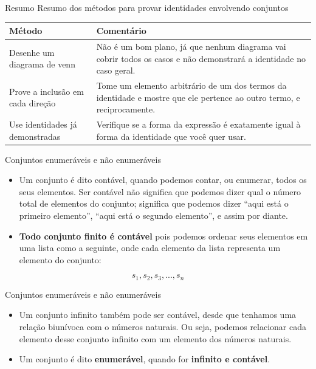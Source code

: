 \documentclass[aspectratio=169]{beamer}
\begin{document}
\begin{frame}{Resumo}
    Resumo dos métodos para provar identidades envolvendo conjuntos

    \begin{table}
        \centering
        \begin{tabular}{|m{6cm}|m{7cm}|}
        \hline
        \textbf{Método} & \textbf{Comentário} \\ \hline
        Desenhe um diagrama de venn & Não é um bom plano, já que nenhum diagrama vai cobrir todos os casos e não demonstrará a identidade no caso geral. \\ \hline
        Prove a inclusão em cada direção & Tome um elemento arbitrário de um dos termos da identidade e mostre que ele pertence ao outro termo, e reciprocamente. \\ \hline
        Use identidades já demonstradas & Verifique se a forma da expressão é
        exatamente igual à forma da
        identidade que você quer usar. \\ \hline
        \end{tabular}
    \end{table}
\end{frame}

\begin{frame}{Conjuntos enumeráveis e não enumeráveis}
\begin{itemize}
    \item Um conjunto é dito contável, quando podemos contar,
    ou enumerar, todos os seus elementos. Ser contável não
    significa que podemos dizer qual o número total de
    elementos do conjunto; significa que podemos dizer
    “aqui está o primeiro elemento”, “aqui está o segundo
    elemento”, e assim por diante.

    \item \textbf{Todo conjunto finito é contável} pois podemos ordenar
    seus elementos em uma lista como a seguinte, onde
    cada elemento da lista representa um elemento do
    conjunto:
\end{itemize}
    \[ s_1, s_2, s_3, ..., s_n\]

\end{frame}

\begin{frame}{Conjuntos enumeráveis e não enumeráveis}
    \begin{itemize}
        \item Um conjunto infinito também pode ser contável, desde
        que tenhamos uma relação biunívoca com o números
        naturais. Ou seja, podemos relacionar cada elemento
        desse conjunto infinito com um elemento dos números
        naturais.
        \item Um conjunto é dito \textbf{enumerável}, quando for \textbf{infinito e contável}.
    \end{itemize}
    
    \end{frame}
\end{document}
